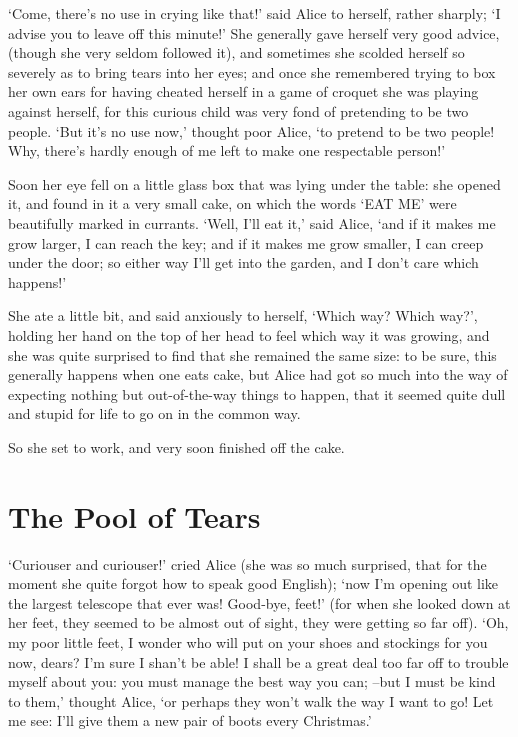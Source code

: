 \documentclass[statementpaper,twoside,openany]{memoir}
\begin{document}
`Come, there's no use in crying like that!' said Alice to herself, rather sharply; `I advise you to leave off this minute!' She generally gave herself very good advice, (though she very seldom followed it), and sometimes she scolded herself so severely as to bring tears into her eyes; and once she remembered trying to box her own ears for having cheated herself in a game of croquet she was playing against herself, for this curious child was very fond of pretending to be two people. `But it's no use now,' thought poor Alice, `to pretend to be two people! Why, there's hardly enough of me left to make one respectable person!'

Soon her eye fell on a little glass box that was lying under the table: she opened it, and found in it a very small cake, on which the words `EAT ME' were beautifully marked in currants. `Well, I'll eat it,' said Alice, `and if it makes me grow larger, I can reach the key; and if it makes me grow smaller, I can creep under the door; so either way I'll get into the garden, and I don't care which happens!'

She ate a little bit, and said anxiously to herself, `Which way? Which way?', holding her hand on the top of her head to feel which way it was growing, and she was quite surprised to find that she remained the same size: to be sure, this generally happens when one eats cake, but Alice had got so much into the way of expecting nothing but out-of-the-way things to happen, that it seemed quite dull and stupid for life to go on in the common way.

So she set to work, and very soon finished off the cake.

\chapter{The Pool of Tears}

`Curiouser and curiouser!' cried Alice (she was so much surprised, that for the moment she quite forgot how to speak good English); `now I'm opening out like the largest telescope that ever was! Good-bye, feet!' (for when she looked down at her feet, they seemed to be almost out of sight, they were getting so far off). `Oh, my poor little feet, I wonder who will put on your shoes and stockings for you now, dears? I'm sure I shan't be able! I shall be a great deal too far off to trouble myself about you: you must manage the best way you can; --but I must be kind to them,' thought Alice, `or perhaps they won't walk the way I want to go! Let me see: I'll give them a new pair of boots every Christmas.'
\end{document}

